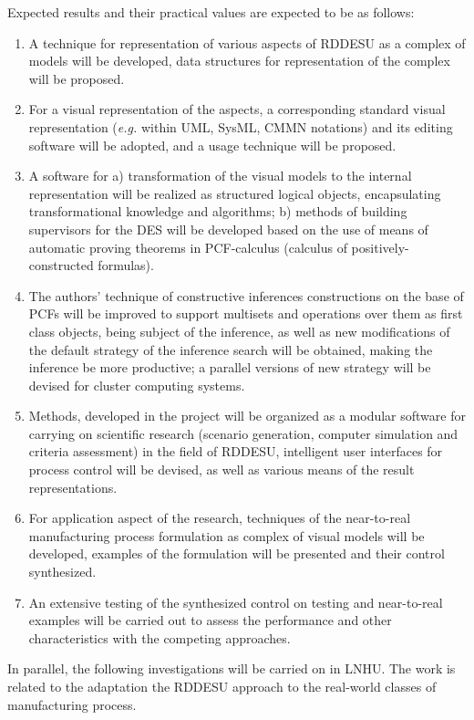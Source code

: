 \documentclass[conference]{IEEEtran}
\begin{document}
Expected results and their practical values are expected to be as follows:
\begin{enumerate}
\item A technique for representation of various aspects of RDDESU as a complex of models will be developed, data structures for representation of the complex will be proposed.
\item For a visual representation of the aspects, a corresponding standard visual representation (\emph{e.g.} within UML, SysML, CMMN notations) and its editing software will be adopted, and a usage technique will be proposed.
\item A software for a) transformation of the visual models to the internal representation will be realized as structured logical objects, encapsulating transformational knowledge and algorithms; b) methods of building supervisors for the DES will be developed based on the use of means of automatic proving theorems in PCF-calculus (calculus of positively-constructed formulas).
\item The authors’ technique of constructive inferences constructions on the base of PCFs will be improved to support multisets and operations over them as first class objects, being subject of the inference, as well as new modifications of the default strategy of the inference search will be obtained, making the inference be more productive; a parallel versions of new strategy will be devised for cluster computing systems.
\item Methods, developed in the project will be organized as a modular software for carrying on scientific research (scenario generation, computer simulation and criteria assessment) in the field of RDDESU, intelligent user interfaces for process control will be devised, as well as various means of the result representations.
\item For application aspect of the research, techniques of the near-to-real manufacturing process formulation as complex of visual models will be developed, examples of the formulation will be presented and their control synthesized.
\item An extensive testing of the synthesized control on testing and near-to-real examples will be carried out to assess the performance and other characteristics with the competing approaches.
\end{enumerate}
In parallel, the following investigations will be carried on in LNHU. The work is related to the adaptation the RDDESU approach to the real-world classes of manufacturing process.
\end{document}
